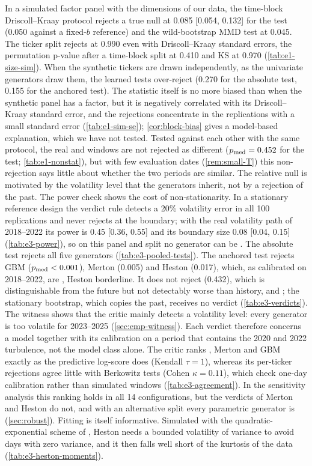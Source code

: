 In a simulated factor panel with the dimensions of our data, the time-block Driscoll--Kraay
protocol rejects a true null at 0.085 [0.054, 0.132] for the \WC{} test (0.050 against a fixed-$b$
reference) and the wild-bootstrap MMD test at 0.045. The ticker split rejects at 0.990 even with
Driscoll--Kraay standard errors, the permutation p-value after a time-block split at 0.410 and KS
at 0.970 (\cref{tab:e1-size-sim}). When the synthetic tickers are drawn independently, as the
univariate generators draw them, the learned tests over-reject (0.270 for the absolute \WC{} test,
0.155 for the anchored test). The statistic itself is no more biased than when the synthetic
panel has a factor, but it is negatively correlated with its Driscoll--Kraay standard error, and
the rejections concentrate in the replications with a small standard error
(\cref{tab:e1-sim-se}); \cref{cor:block-bias} gives a model-based explanation, which we have not
tested. Tested against each other with the same protocol, the real \TRAIN{} and \TEST{} windows are not rejected as
different ($p_{\mathrm{med}}=0.452$ for the \WC{} test; \cref{tab:e1-nonstat}), but with few evaluation dates
(\cref{rem:small-T}) this non-rejection says little about whether the two periods are similar. The
relative null is motivated by the volatility level that the generators inherit, not by a
rejection of the past. The power check shows the cost of non-stationarity. In a stationary
reference design the verdict rule detects a 20\% volatility error in all 100 replications and
never rejects at the boundary; with the real volatility path of 2018--2022 its power is 0.45 [0.36, 0.55] and its boundary size 0.08 [0.04,
0.15] (\cref{tab:e3-power}), so on this panel and split no generator can be \GOOD. The absolute
\WC{} test rejects all five generators (\cref{tab:e3-pooled-tests}). The anchored test rejects GBM
($p_{\mathrm{med}}<0.001$), Merton (0.005) and Heston (0.017), which, as calibrated on 2018--2022, are \BAD{},
Heston borderline. It does not reject \GARCHt{} (0.432), which is distinguishable from the future
but not detectably worse than history, and \INCONCL{}; the stationary bootstrap, which copies the
past, receives no verdict (\cref{tab:e3-verdicts}). The witness shows that the critic mainly
detects a volatility level: every generator is too volatile for 2023--2025
(\cref{sec:emp-witness}). Each verdict therefore concerns a model together with its calibration
on a period that contains the 2020 and 2022 turbulence, not the model class alone. The critic ranks
\GARCHt{}, Merton and GBM exactly as the predictive log-score does (Kendall $\tau=1$), whereas its
per-ticker rejections agree little with Berkowitz tests (Cohen $\kappa=0.11$), which check one-day
calibration rather than simulated windows (\cref{tab:e3-agreement}). In the sensitivity analysis
this ranking holds in all 14 configurations, but the \BAD{} verdicts of Merton and Heston do not,
and with an alternative split every parametric generator is \INCONCL{} (\cref{sec:robust}).
Fitting is itself informative. Simulated with the quadratic-exponential scheme of \citet{andersen_2008_simple},
Heston needs a bounded volatility of variance to avoid days with zero variance, and it then falls
well short of the kurtosis of the data (\cref{tab:e3-heston-moments}).

